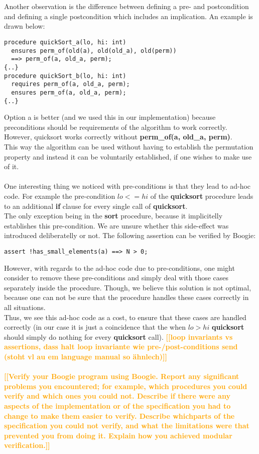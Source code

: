 \documentclass{report}
\newcommand{\todo}[1]{\textsf{\textbf{\textcolor{orange}{[[#1]]}}}}
\begin{document}
\\\\
Another observation is the difference between defining a pre- and postcondition and defining a single postcondition which includes an implication.
An example is drawn below:
\begin{lstlisting}
procedure quickSort_a(lo, hi: int)
  ensures perm_of(old(a), old(old_a), old(perm)) 
  ==> perm_of(a, old_a, perm);
{..}
procedure quickSort_b(lo, hi: int)
  requires perm_of(a, old_a, perm);
  ensures perm_of(a, old_a, perm);
{..}
\end{lstlisting}
Option a is better (and we used this in our implementation) because preconditions should be requirements of the algorithm to work correctly.
However, quicksort works correctly without \textbf{perm\_of(a, old\_a, perm)}.
\\
This way the algorithm can be used without having to establish the permutation property
and instead it can be voluntarily established, if one wishes to make use of it.
\\\\
One interesting thing we noticed with pre-conditions is that they lead to ad-hoc code.
For example the pre-condition $lo <= hi$ of the \textbf{quicksort} procedure leads to
an additional \textbf{if} clause for every single call of \textbf{quicksort}.\\
The only exception being in the \textbf{sort} procedure, because it implicitelly
establishes this pre-condition. We are unsure whether this side-effect was
introduced deliberatelly or not. The following assertion can be verified by Boogie:
\begin{lstlisting}
assert !has_small_elements(a) ==> N > 0;
\end{lstlisting}
However, with regards to the ad-hoc code due to pre-conditions, one might consider
to remove these pre-conditions and simply deal with those cases separately inside
the procedure. Though, we believe this solution is not optimal, because one can not
be sure that the procedure handles these cases correctly in all situations.\\
Thus, we see this ad-hoc code as a cost, to ensure that these cases are handled
correctly (in our case it is just a coincidence that the when $lo > hi$ \textbf{quicksort}
should simply do nothing for every \textbf{quicksort} call).
\todo{loop invariants vs assertions, dass halt loop invariante wie pre-/post-conditions send (stoht vl au em language manual so ähnlech)}
\\\\
\todo{Verify your Boogie program using Boogie. Report any
significant problems you encountered; for example, which procedures you could verify
and which ones you could not. Describe if there were any aspects of the implementation
or of the specification you had to change to make them easier to verify. Describe whichparts of the specification you could not verify, and what the limitations were that
prevented you from doing it. Explain how you achieved modular verification.}
\end{document}
